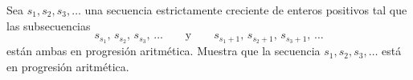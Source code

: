 Sea $s_1,s_2,s_3,\ldots$ una secuencia estrictamente creciente de enteros positivos tal que las subsecuencias 
\[s_{s_1},\, s_{s_2},\, s_{s_3},\, \ldots\qquad\text{y}\qquad s_{s_1+1},\, s_{s_2+1},\, s_{s_3+1},\, \ldots\]
están ambas en progresión aritmética. Muestra que la secuencia $s_1,s_2,s_3,\ldots$ está en progresión aritmética.
